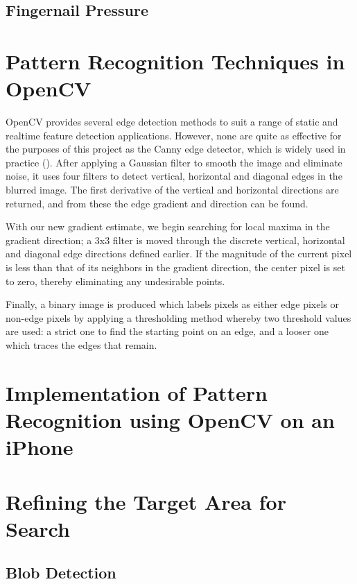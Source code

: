 \subsection{Fingernail Pressure}\label{sec:FingernailPressure}
\section{Pattern Recognition Techniques in OpenCV}\label{sec:PaternRecognitionOpenCV}

OpenCV provides several edge detection methods to suit a range of static and realtime feature detection applications. However, none are quite as effective for the purposes of this project as the Canny edge detector, which is widely used in practice (\cite{Ziou1998}). After applying a Gaussian filter to smooth the image and eliminate noise, it uses four filters to detect vertical, horizontal and diagonal edges in the blurred image. The first derivative of the vertical and horizontal directions are returned, and from these the edge gradient and direction can be found.

With our new gradient estimate, we begin searching for local maxima in the gradient direction; a 3x3 filter is moved through the discrete vertical, horizontal and diagonal edge directions defined earlier. If the magnitude of the current pixel is less than that of its neighbors in the gradient direction, the center pixel is set to zero, thereby eliminating any undesirable points.

Finally, a binary image is produced which labels pixels as either edge pixels or non-edge pixels by applying a thresholding method whereby two threshold values are used: a strict one to find the starting point on an edge, and a looser one which traces the edges that remain.

\section{Implementation of Pattern Recognition using OpenCV on an iPhone}\label{sec:ImplementationOnIPhone}

\section{Refining the Target Area for Search}\label{sec:RefiningTargetAreaForSearch}

\subsection{Blob Detection}\label{sec:BlobDetection}

